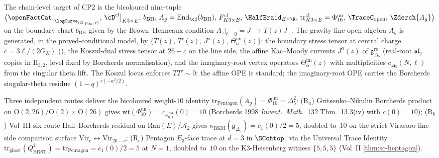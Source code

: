 \begin{remark}[Bicoloured primitive package and three routes to the
Pentagon weight $\Phi_{10}^{\mathrm{un}} = \Delta_5^{2}$]
\label{rem:gravity-line-three-route-pentagon}
The chain-level target of CP2 is the bicoloured nine-tuple
$\bigl(\openFactCat\big|_{\logCurve_{(E, p_\infty, \tau)}},\,
\cD^{\mathrm{cl}}\big|_{K3 \times E},\,b_{\mathrm{BH}},\,
A_g = \mathrm{End}_\cC(b_{\mathrm{BH}}),\,F^{\mathrm{cl}}_{K3 \times E},\,
{\HalfBraid}_{E \times \R},\,\mathrm{tr}^{\mathrm{cl}}_{K3 \times E}
= \Phi_{10}^{\mathrm{un}},\,{\TraceC}_{\mathrm{open}},\,
\Zderch{A_g}\bigr)$
on the boundary chart $b_{\mathrm{BH}}$ given by the Brown--Henneaux
condition $A_z|_{t = 0} = J_- + T(z) J_+$. The gravity-line open
algebra $A_g$ is generated, in the proved-conditional model, by
$\{T(z),\, T'(z),\, J^a(z),\, \Theta^{\mathrm{im}}_\alpha(z)\}$:
the boundary stress tensor at central charge $c = 3 \ell / (2 G_N)$
(\cite{BH86}), the Koszul-dual stress tensor at $26 - c$ on the
line side, the affine Kac--Moody currents
$J^a(z)$ of $\mathfrak g_{\Delta_5}^{\mathrm{re}}$ (real-root
$\mathfrak{sl}_2$ copies in $\mathrm{II}_{3, 2}$, level fixed by
Borcherds normalisation), and the imaginary-root vertex operators
$\Theta^{\mathrm{im}}_\alpha(z)$ with multiplicities
$c_{\Delta_5}(N, \ell)$ from the singular theta lift. The Koszul
locus enforces $TT' \sim 0$; the affine OPE is standard; the
imaginary-root OPE carries the Borcherds singular-theta residue
$(1 - q)^{c(-\alpha^2 / 2)}$.

Three independent routes deliver the bicoloured weight-$10$
identity $\mathrm{tr}_{\mathrm{Pentagon}}(A_g) = \Phi_{10}^{\mathrm{un}}
= \Delta_5^{2}$:
\textup{(R$_a$)} Gritsenko--Nikulin Borcherds product on
$\mathrm{O}(2, 26)/\mathrm{O}(2) \times \mathrm{O}(26)$ gives
$\mathrm{wt}(\Phi_{10}^{\mathrm{un}}) = c_{\phi_{0, 1}^{K3}}(0) = 10$
(Borcherds 1998 \emph{Invent.\ Math.}~132 Thm.~13.3(iv) with
$c(0) = 10$); \textup{(R$_b$)} Vol~III six-route Hall--Borcherds
residual on $\mathrm{Ran}(E) / \overline{\mathcal A_2}$ gives
$\kappa_{\mathrm{BKM}}(\mathfrak g_{\Delta_5}) = c_1(0)/2 = 5$, doubled
to~$10$ on the strict Virasoro line-side comparison surface
$\mathrm{Vir}_c \leftrightarrow \mathrm{Vir}_{26 - c}$;
\textup{(R$_c$)} Pentagon $E_3$-face trace at $d = 3$ in
$\SCchtop$, via the Universal Trace Identity
$\mathrm{tr}_{\mathrm{ghost}}(Q_{\mathrm{BRST}}^2) =
\mathrm{tr}_{\mathrm{Pentagon}} = c_1(0)/2 = 5$ at $N = 1$, doubled
to~$10$ on the K3-Heisenberg witness $\{5, 5, 5\}$ \textup{(}Vol~II
\cref{thm:sc-heptagon}\textup{)}.


\end{remark}
